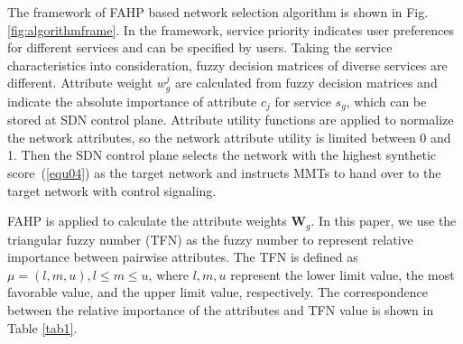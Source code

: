 \documentclass[conference]{IEEEtran}
\begin{document}
The framework of FAHP based network selection algorithm is shown in Fig. \ref{fig:algorithmframe}. 
In the framework, service priority indicates user preferences for different services and can be specified by users.
 Taking the service characteristics into consideration, fuzzy decision matrices of diverse services are different. 
 Attribute weight $w_g^j$ are calculated from fuzzy decision matrices and indicate the absolute importance of attribute $c_j$ for service $s_{g}$, which can be stored at SDN control plane.
Attribute utility functions are applied to normalize the network attributes, so the network attribute utility is limited between 0 and 1.
Then the SDN control plane selects the network with the highest synthetic score~(\ref{equ04}) as the target network and instructs MMTs to hand over to the target network with control signaling.

FAHP is applied to calculate the attribute weights $\boldsymbol{W}_g$. In this paper, we use the triangular fuzzy number (TFN) as the fuzzy number to represent relative importance between pairwise attributes. The TFN is defined as $\mu = (l,m,u), l \le m \le u$, where $l, m, u$ represent the lower limit value, the most favorable value, and the upper limit value, respectively. The correspondence between the relative importance of the attributes and TFN value is shown in Table \ref{tab1}. 
\end{document}
